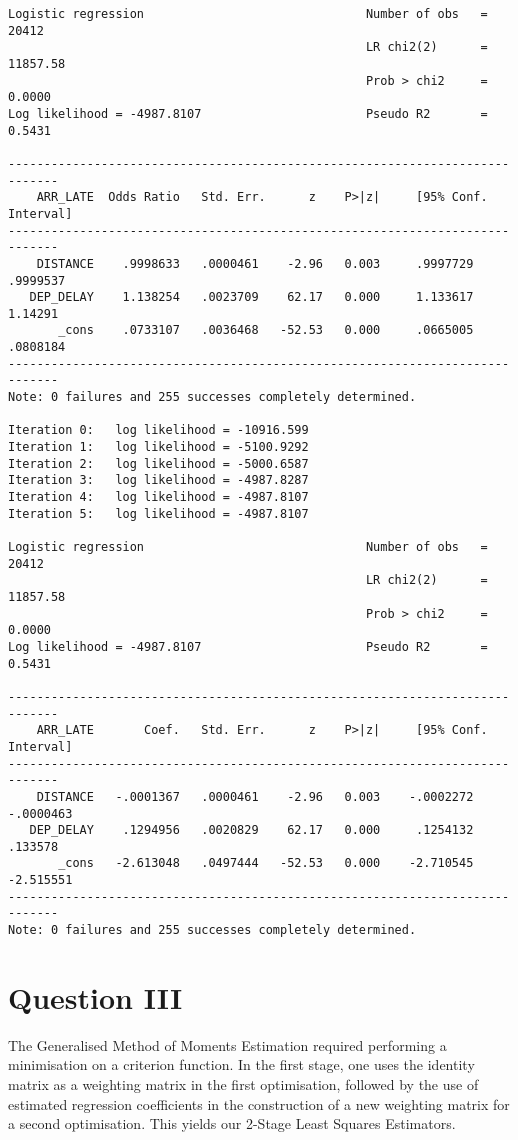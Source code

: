 \documentclass{article}
\begin{document}
\begin{lstlisting}
Logistic regression                               Number of obs   =      20412
                                                  LR chi2(2)      =   11857.58
                                                  Prob > chi2     =     0.0000
Log likelihood = -4987.8107                       Pseudo R2       =     0.5431

-----------------------------------------------------------------------------
    ARR_LATE  Odds Ratio   Std. Err.      z    P>|z|     [95% Conf. Interval]
-----------------------------------------------------------------------------
    DISTANCE    .9998633   .0000461    -2.96   0.003     .9997729    .9999537
   DEP_DELAY    1.138254   .0023709    62.17   0.000     1.133617     1.14291
       _cons    .0733107   .0036468   -52.53   0.000     .0665005    .0808184
-----------------------------------------------------------------------------
Note: 0 failures and 255 successes completely determined.

Iteration 0:   log likelihood = -10916.599  
Iteration 1:   log likelihood = -5100.9292  
Iteration 2:   log likelihood = -5000.6587  
Iteration 3:   log likelihood = -4987.8287  
Iteration 4:   log likelihood = -4987.8107  
Iteration 5:   log likelihood = -4987.8107  

Logistic regression                               Number of obs   =      20412
                                                  LR chi2(2)      =   11857.58
                                                  Prob > chi2     =     0.0000
Log likelihood = -4987.8107                       Pseudo R2       =     0.5431

-----------------------------------------------------------------------------
    ARR_LATE       Coef.   Std. Err.      z    P>|z|     [95% Conf. Interval]
-----------------------------------------------------------------------------
    DISTANCE   -.0001367   .0000461    -2.96   0.003    -.0002272   -.0000463
   DEP_DELAY    .1294956   .0020829    62.17   0.000     .1254132     .133578
       _cons   -2.613048   .0497444   -52.53   0.000    -2.710545   -2.515551
-----------------------------------------------------------------------------
Note: 0 failures and 255 successes completely determined.
\end{lstlisting}


\newpage
\section{Question III}
The Generalised Method of Moments Estimation required performing a minimisation on a criterion function. In the first stage, one uses the identity matrix as a weighting matrix in the first optimisation, followed by the use of estimated regression coefficients in the construction of a new weighting matrix for a second optimisation. This yields our 2-Stage Least Squares Estimators.
\end{document}
